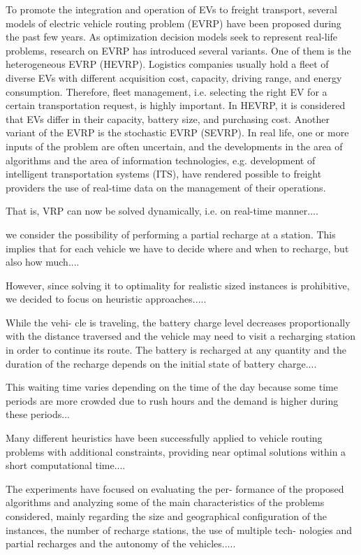 \documentclass[11pt]{article}
\begin{document}
To promote the integration and operation of EVs to freight transport, several models of electric vehicle routing problem (EVRP) have been proposed during the past few years. As optimization decision models seek to represent real-life problems, research on EVRP has introduced several variants. One of them is the heterogeneous EVRP (HEVRP). Logistics companies usually hold a fleet of diverse EVs with different acquisition cost, capacity, driving range, and energy consumption. Therefore, fleet management, i.e. selecting the right EV for a certain transportation request, is highly important. In HEVRP, it is considered that EVs differ in their capacity, battery size, and purchasing cost. Another variant of the EVRP is the stochastic EVRP (SEVRP). In real life, one or more inputs of the problem are often uncertain, and the developments in the area of algorithms and the area of information technologies, e.g. development of intelligent transportation systems (ITS), have rendered possible to freight providers the use of real-time data on the management of their operations. 

That is, VRP can now be solved dynamically, i.e. on real-time manner....

we consider the possibility of performing a partial recharge at a station. This implies that for each vehicle we have to decide where and when to recharge, but also how much....

However, since solving it to optimality for realistic sized instances is prohibitive, we decided to focus on heuristic approaches.....

While the vehi- cle is traveling, the battery charge level decreases proportionally with the distance traversed and the vehicle may need to visit a recharging station in order to continue its route. The battery is recharged at any quantity and the duration of the recharge depends on the initial state of battery charge....

This waiting time varies depending on the time of the day because some time periods are more crowded due to rush hours and the demand is higher during these periods...

Many different heuristics have been successfully applied to vehicle routing problems with additional constraints, providing near optimal solutions within a short computational time....

The experiments have focused on evaluating the per- formance of the proposed algorithms and analyzing some of the main characteristics of the problems considered, mainly regarding the size and geographical configuration of the instances, the number of recharge stations, the use of multiple tech- nologies and partial recharges and the autonomy of the vehicles.....
\end{document}
